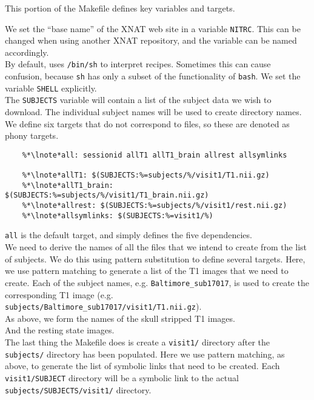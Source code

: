 This portion of the Makefile defines key variables and targets. 

\indent {}We set the ``base name'' of the XNAT web site in a variable \texttt{NITRC}. This can be changed when using another XNAT repository, and the variable can be named accordingly. \\
\indent {} By default, \maken{} uses \texttt{/bin/sh} to interpret recipes. Sometimes this can cause confusion, because \texttt{sh} has only a subset of the functionality of \texttt{bash}. We set the \maken{} variable \texttt{SHELL} explicitly. \\
\indent {}The \texttt{SUBJECTS} variable will contain a list of the subject data we wish to download. The individual subject names will be used to create directory names. \\
\indent {}We define six targets that do not correspond to files, so these are denoted as phony targets.

\begin{lstlisting}
	%*\lnote*all: sessionid allT1 allT1_brain allrest allsymlinks

	%*\lnote*allT1: $(SUBJECTS:%=subjects/%/visit1/T1.nii.gz)
	%*\lnote*allT1_brain: $(SUBJECTS:%=subjects/%/visit1/T1_brain.nii.gz)
	%*\lnote*allrest: $(SUBJECTS:%=subjects/%/visit1/rest.nii.gz)
	%*\lnote*allsymlinks: $(SUBJECTS:%=visit1/%)
\end{lstlisting}

\indent {} \texttt{all} is the default target, and simply defines the five dependencies. \\
\indent {} We need to derive the names of all the files that we
intend to create from the list of subjects. We do this using pattern
substitution to define several targets. Here, we use pattern matching
to generate a list of the T1 images that we need to create. Each of
the subject names, e.g. \texttt{Baltimore_sub17017}, is used to create
the corresponding T1 image (e.g. \texttt{subjects/Baltimore_sub17017/visit1/T1.nii.gz}).\\
\indent {} As above, we form the names of the skull stripped T1 images.\\
\indent {} And the resting state images.\\
\indent {} The last thing the Makefile does is create a
\texttt{visit1/} directory after the \texttt{subjects/} directory has
been populated. Here we use pattern matching, as above, to generate
the list of symbolic links that need to be created.  Each
\texttt{visit1/SUBJECT} directory will be a symbolic link to the actual \texttt{subjects/SUBJECTS/visit1/} directory.


